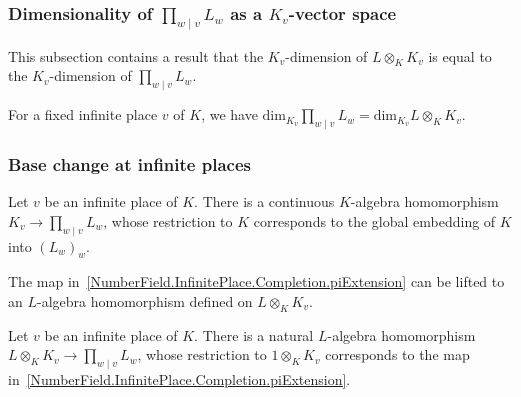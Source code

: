 \subsubsection{Dimensionality of $\prod_{w\mid v}L_w$ as a $K_v$-vector space}

This subsection contains a result that the $K_v$-dimension of
$L \otimes_K K_v$ is equal to the $K_v$-dimension of $\prod_{w\mid v}L_w$.

\begin{theorem}
  \label{NumberField.InfinitePlace.Completion.finrank_pi_eq_finrank_tensorProduct}
  For a fixed infinite place $v$ of $K$, we have
  $\text{dim}_{K_v} \prod_{w\mid v} L_w = \text{dim}_{K_v} L\otimes_K K_v$.
\end{theorem}

\subsubsection{Base change at infinite places}

\begin{definition}
  \label{NumberField.InfinitePlace.Completion.piExtension}
  \leanok
  Let $v$ be an infinite place of $K$. There is a continuous $K$-algebra homomorphism
  $K_v \to \prod_{w\mid v}L_w$, whose restriction to $K$ corresponds to the global embedding
  of $K$ into $(L_w)_w$.
\end{definition}

The map in~\ref{NumberField.InfinitePlace.Completion.piExtension} can be lifted to an
$L$-algebra homomorphism defined on $L\otimes_K K_v$.

\begin{definition}
  \label{NumberField.InfinitePlace.Completion.baseChange}
  \leanok
  Let $v$ be an infinite place of $K$. There is a natural $L$-algebra homomorphism
  $L\otimes_K K_v \to \prod_{w\mid v}L_w$, whose restriction to $1\otimes_K K_v$ corresponds to
  the map in~\ref{NumberField.InfinitePlace.Completion.piExtension}.
\end{definition}

